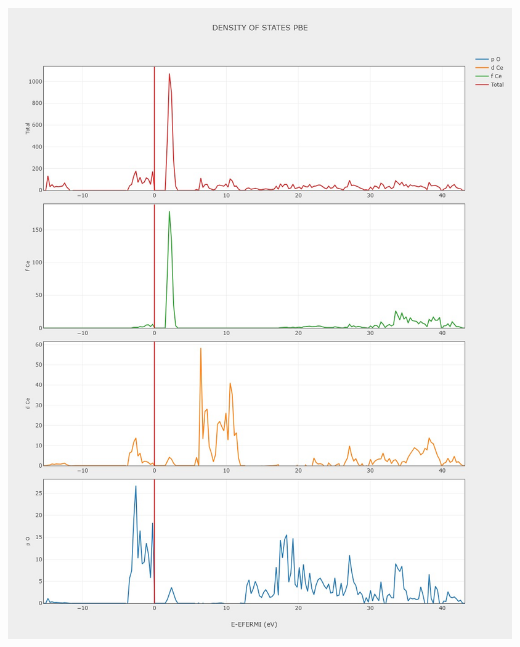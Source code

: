 \documentclass{article}
\begin{document}
\begin{minipage}{0.49\textwidth}
	\centering
	\includegraphics[width=1\textwidth]{../images/correct_band_and_dos/DOSS PBE.jpeg}
    \label{fig:DOS_PBE}
\end{minipage}
\end{document}
